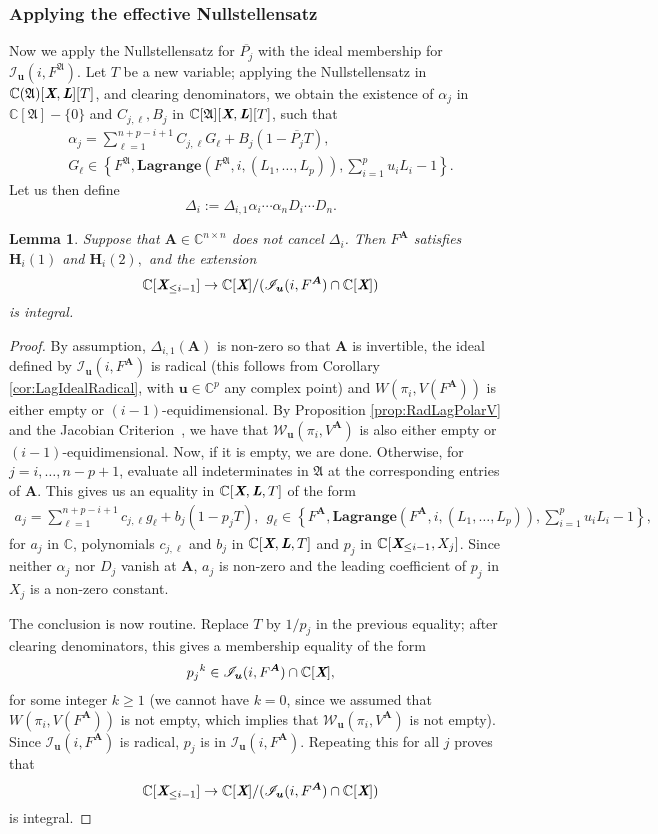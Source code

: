 \documentclass[12pt]{article}
\def\A{\mathfrak{A}}
\def\Lb{\textit{\textbf{L}}}
\def\Xb{\textit{\textbf{X}}}
\def\mA{{\bm A}}
\def\ub{{\bm u}}
\def\pjb{\overline{P_{j}}}
\def\D{\Delta}
\def\C{\mathbb{C}}
\def\WiA{W(\pi_i,V(F^{\mA}))}
\def\lagFA{{\bm{Lagrange}}(F^{\mA},i,(L_1,\hdots,L_p))}
\def\lagFfA{{\bm{Lagrange}}(F^{\A},i,(L_1,\hdots,L_p))}
\def\IilA{\mathscr{I}_{\ub}(i,F^{\mA})}
\def\IilfA{\mathscr{I}_{\ub}(i,F^{\A})}
\def\WilA{\mathscr{W}_{\ub}(\pi_i,V^{\mA})}
\def\udl{\sum_{i=1}^pu_iL_i}
\newtheorem{lemma}[theorem]{Lemma}
\begin{document}
\subsubsection{Applying the effective Nullstellensatz}
Now we apply the Nullstellensatz for $\pjb$ with the ideal membership for $\IilfA.$ Let $T$ be a new variable; applying the
Nullstellensatz in $\C(\A)[\Xb,\Lb][T]$, and clearing
denominators, we obtain the existence of $\alpha_j$ in
$\C[\A]-\{0\}$ and $ C_{j,\ell},B_j$ in
$\C[\A][\Xb,\Lb][T]$, such that
\begin{align*}
\alpha_j = \sum_{\ell=1}^{n+p-i+1} C_{j,\ell} G_\ell + B_j (1-\pjb T),\\  G_\ell \in 
\left\{ 
F^\A,\lagFfA, \udl-1
\right\}.
\end{align*}
Let us then define 
$$\D_{i}:=\D_{i,1} \alpha_i \cdots \alpha_n D_i \cdots D_n.$$

\begin{lemma}\label{lem:6.4}
Suppose that $\mA \in \C^{n\times n}$ does not cancel $\D_{i}$. Then $F^{\mA}$ satisfies $\bm H_i(1)$ and $\bm H_i(2),$ and the extension
\[
 \C[\Xb_{\leq i-1}]\rightarrow \C[\Xb]/(\IilA \cap \C[\Xb])
\]
is integral.
\end{lemma}

\begin{proof}
By assumption, $\D_{i,1}(\mA)$ is non-zero so that $\mA$ is
invertible, the
ideal defined by $\IilA$ is radical (this follows from Corollary \ref{cor:LagIdealRadical}, with $\ub \in \C^p$ any complex point) and 
$\WiA$ is either empty or $(i-1)$-equidimensional. By Proposition \ref{prop:RadLagPolarV} and the Jacobian Criterion~\cite[Corollary 16.20]{ECA}, we have that $\WilA$ is also either empty or $(i-1)$-equidimensional. Now, if
it is empty, we are done. Otherwise, for $j=i,\dots,n-p+1$, evaluate all indeterminates in $\A$ at the
corresponding entries of $\mA$. This gives us
an equality in $\C[\Xb,\Lb,T]$ of the form
\begin{align*}
a_j = \sum_{\ell=1}^{n+p-i+1} c_{j,\ell} g_\ell + b_j (1-p_j T),\ \  g_\ell \in 
\left\{ 
F^{\mA}, \lagFA, \udl-1
\right\},
\end{align*}
for $a_j$ in $\C$, polynomials $c_{j,\ell}$ and $b_j$ in
$\C[\Xb,\Lb,T]$ and $p_j$ in
$\C[\Xb_{\leq i-1},X_j]$. Since neither $\alpha_j$ nor $D_j$
vanish at $\mA$, $a_j$ is non-zero and the leading coefficient of
$p_j$ in $X_j$ is a non-zero constant.

The conclusion is now routine. Replace $T$ by $1/p_j$ in the
previous equality; after clearing denominators, this gives a
membership equality of the form 
\[
p_j{}^k \in \IilA \cap \C[\Xb],
\]
for some integer $k \ge 1$ (we cannot have $k=0$, since we assumed that $\WiA$ is not empty, which implies that $\WilA$ is not empty). Since $\IilA$ is radical,
$p_j$ is in $\IilA$. Repeating this for all $j$ proves that 
\[
\C[\Xb_{\leq i-1}]\rightarrow\C[\Xb]/(\IilA \cap \C[\Xb])
\]
is integral.
\end{proof}
\end{document}
